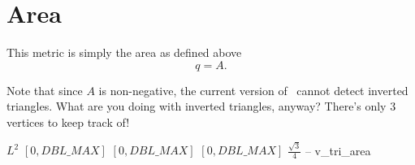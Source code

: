 \section{Area\label{s:tri-area}}

This metric is simply the area as defined above
\[
  q = A.
\]

Note that since $A$ is non-negative, the current version of \verd\ cannot detect inverted triangles.
What are you doing with inverted triangles, anyway? There's only 3 vertices to keep track of!

%
{$L^2$}%
{$[0,DBL\_MAX]$}%
{$[0,DBL\_MAX]$}%
{$[0,DBL\_MAX]$}%
{$\frac{\sqrt{3}}{4}$}%
{--}%
{v\_tri\_area}%
  
  
  
  
  
  
